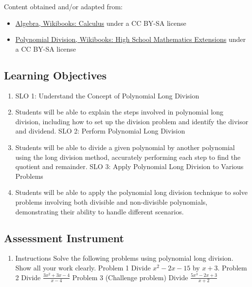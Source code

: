 Content obtained and/or adapted from:
\begin{itemize}
    \item \href{https://en.wikibooks.org/wiki/Calculus/Algebra}{Algebra, Wikibooks: Calculus} under a CC BY-SA license
    \item \href{https://en.wikibooks.org/wiki/High_School_Mathematics_Extensions/Supplementary/Polynomial_Division}{Polynomial Division, Wikibooks: High School Mathematics Extensions} under a CC BY-SA license
\end{itemize}

\subsection{Learning Objectives}

\begin{enumerate}
    \item SLO 1: Understand the Concept of Polynomial Long Division
    \item Students will be able to explain the steps involved in polynomial long division, including how to set up the division problem and identify the divisor and dividend. SLO 2: Perform Polynomial Long Division
    \item Students will be able to divide a given polynomial by another polynomial using the long division method, accurately performing each step to find the quotient and remainder. SLO 3: Apply Polynomial Long Division to Various Problems
    \item Students will be able to apply the polynomial long division technique to solve problems involving both divisible and non-divisible polynomials, demonstrating their ability to handle different scenarios.
\end{enumerate}

\subsection{Assessment Instrument}

\begin{enumerate}
    \item Instructions Solve the following problems using polynomial long division. Show all your work clearly. Problem 1 Divide $x^2 - 2x - 15$ by $x + 3$. Problem 2 Divide $\frac{3x^2 + 3x - 4}{x - 4}$ Problem 3 (Challenge problem) Divide $\frac{5x^3 - 2x + 3}{x + 2}$
\end{enumerate}

